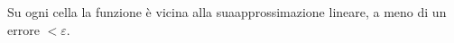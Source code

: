 \documentclass[preview]{standalone}
\begin{document}
\begin{center}
Su ogni cella la funzione è vicina alla suaapprossimazione lineare, a meno di un errore $< \varepsilon$.
\end{center}
\end{document}
